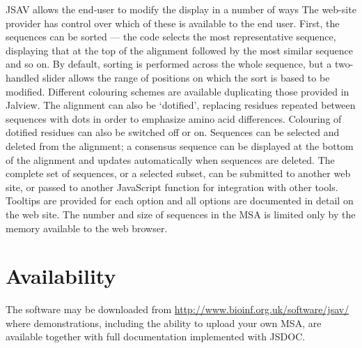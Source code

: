 \documentclass[a4]{article}
\begin{document}
JSAV allows the end-user to modify the display in a number of ways The
web-site provider has control over which of these is available to the
end user. First, the sequences can be sorted --- the code selects the
most representative sequence, displaying that at the top of the
alignment followed by the most similar sequence and so on. By default,
sorting is performed across the whole sequence, but a two-handled
slider allows the range of positions on which the sort is based to be
modified. Different colouring schemes are available duplicating those
provided in Jalview. The alignment can also be `dotified', replacing
residues repeated between sequences with dots in order to emphasize
amino acid differences. Colouring of dotified residues can also be
switched off or on. Sequences can be selected and deleted from the
alignment; a consensus sequence can be displayed at the bottom of the
alignment and updates automatically when sequences are deleted. The
complete set of sequences, or a selected subset, can be submitted to
another web site, or passed to another JavaScript function for
integration with other tools. Tooltips are provided for each option
and all options are documented in detail on the web site. The number
and size of sequences in the MSA is limited only by the memory
available to the web browser.

\section{Availability}
The software may be downloaded from
\url{http://www.bioinf.org.uk/software/jsav/} where demonstrations,
including the ability to upload your own MSA, are available together
with full documentation implemented with JSDOC.


\end{document}
